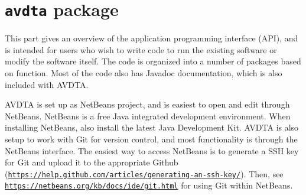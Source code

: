 \chapter{\texttt{avdta} package}

This part gives an overview of the application programming interface (API), and is intended for users who wish to write code to run the existing software or modify the software itself. The code is organized into a number of packages based on function. Most of the code also has Javadoc documentation, which is also included with AVDTA.



AVDTA is set up as NetBeans project, and is easiest to open and edit through NetBeans. NetBeans is a free Java integrated development environment. When installing NetBeans, also install the latest Java Development Kit. AVDTA is also setup to work with Git for version control, and most functionality is through the NetBeans interface. The easiest way to access NetBeans is to generate a SSH key for Git and upload it to the appropriate Github  (\href{https://help.github.com/articles/generating-an-ssh-key/}{\texttt{https://help.github.com/articles/generating-an-ssh-key/}}). Then, see \href{https://netbeans.org/kb/docs/ide/git.html}{\texttt{https://netbeans.org/kb/docs/ide/git.html}} for using Git within NetBeans.


